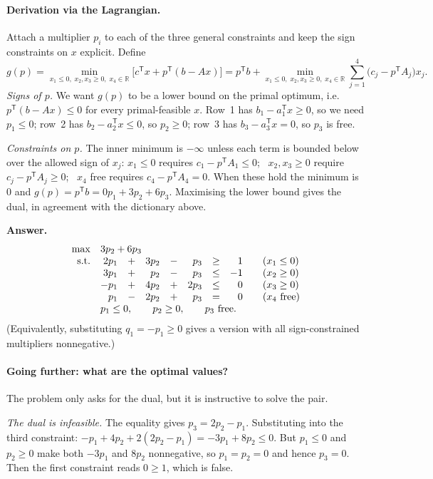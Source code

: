 \documentclass[11pt]{article}
\newcommand{\R}{\mathbb{R}}
\newcommand{\T}{^{\mathsf T}}
\newcommand{\answer}[1]{\begin{shaded}\noindent\textbf{Answer.} #1\end{shaded}}
\begin{document}
\paragraph{Derivation via the Lagrangian.} Attach a multiplier $p_i$ to each of the three general constraints and keep the sign constraints on $x$ explicit. Define
\[
g(p)=\min_{x_1\le0,\;x_2,x_3\ge0,\;x_4\in\R}\Big[c\T x+p\T(b-Ax)\Big]
=p\T b+\min_{x_1\le0,\;x_2,x_3\ge0,\;x_4\in\R}\sum_{j=1}^4\big(c_j-p\T A_j\big)x_j .
\]
\emph{Signs of $p$.} We want $g(p)$ to be a lower bound on the primal optimum, i.e.\ $p\T(b-Ax)\le0$ for every primal-feasible $x$. Row~1 has $b_1-a_1\T x\ge0$, so we need $p_1\le0$; row~2 has $b_2-a_2\T x\le0$, so $p_2\ge0$; row~3 has $b_3-a_3\T x=0$, so $p_3$ is free.

\emph{Constraints on $p$.} The inner minimum is $-\infty$ unless each term is bounded below over the allowed sign of $x_j$:
$x_1\le0$ requires $c_1-p\T A_1\le0$; \ $x_2,x_3\ge0$ require $c_j-p\T A_j\ge0$; \ $x_4$ free requires $c_4-p\T A_4=0$. When these hold the minimum is $0$ and $g(p)=p\T b=0p_1+3p_2+6p_3$. Maximising the lower bound gives the dual, in agreement with the dictionary above.

\answer{
\[
\begin{array}{rrcrcrcl}
\max & \multicolumn{5}{l}{3p_2+6p_3}\\
\text{s.t.} & 2p_1&+&3p_2&-&p_3&\ge&\phantom{-}1\qquad(x_1\le0)\\
& 3p_1&+&p_2&-&p_3&\le&-1\qquad(x_2\ge0)\\
& -p_1&+&4p_2&+&2p_3&\le&\phantom{-}0\qquad(x_3\ge0)\\
& p_1&-&2p_2&+&p_3&=&\phantom{-}0\qquad(x_4\text{ free})\\
& \multicolumn{7}{l}{p_1\le0,\qquad p_2\ge0,\qquad p_3\ \text{free}.}
\end{array}
\]
(Equivalently, substituting $q_1=-p_1\ge0$ gives a version with all sign-constrained multipliers nonnegative.)}

\paragraph{Going further: what are the optimal values?} The problem only asks for the dual, but it is instructive to solve the pair.

\emph{The dual is infeasible.} The equality gives $p_3=2p_2-p_1$. Substituting into the third constraint: $-p_1+4p_2+2(2p_2-p_1)=-3p_1+8p_2\le0$. But $p_1\le0$ and $p_2\ge0$ make both $-3p_1$ and $8p_2$ nonnegative, so $p_1=p_2=0$ and hence $p_3=0$. Then the first constraint reads $0\ge1$, which is false.
\end{document}
